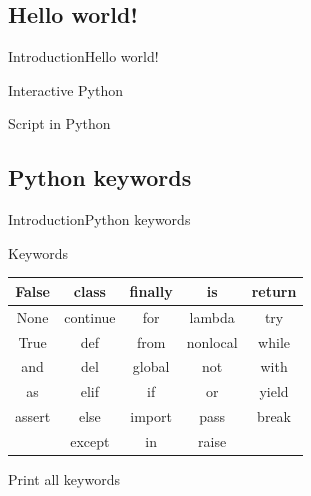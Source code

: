 \documentclass[10pt]{beamer}
\begin{document}
\subsection{Hello world!}
\begin{frame}{Introduction}{Hello world!}
\begin{block}{Interactive Python}
\interactivePython
\end{block}
\pause 		
\begin{block}{Script in Python}
\scriptPython
\end{block}

\end{frame}
 		
\subsection{Python keywords}
\begin{frame}{Introduction}{Python keywords}
\begin{block}{Keywords}
 		
 	\begin{center}
	 		\begin{tabular}{| c | c | c | c | c |}
	 		\hline
	 		False & class & finally & is & return \\ \hline
	 		None & continue & for & lambda& try \\ \hline
	 		True & def & from & nonlocal & while \\ \hline
	 		and & del & global & not & with \\ \hline
	 		as & elif & if & or & yield \\ \hline
	 		assert & else & import & pass & break \\ \hline
	 		& except & in & raise & \\ \hline
	 		\end{tabular}
 	\end{center}
\end{block}
\pause
\begin{block}{Print all keywords}
	 \keywordsPython
\end{block}
 			
\end{frame}
\end{document}
